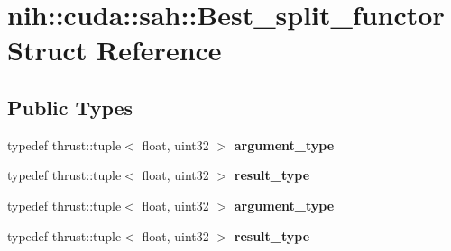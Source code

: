 \hypertarget{structnih_1_1cuda_1_1sah_1_1_best__split__functor}{
\section{nih\-:\-:cuda\-:\-:sah\-:\-:\-Best\-\_\-split\-\_\-functor \-Struct \-Reference}
\label{structnih_1_1cuda_1_1sah_1_1_best__split__functor}
}
\subsection*{\-Public \-Types}
\begin{DoxyCompactItemize}
\item 
\hypertarget{structnih_1_1cuda_1_1sah_1_1_best__split__functor_aa7990901ab2fcd293a7285f19d3d6a17}{
typedef thrust\-::tuple$<$ float, \*
uint32 $>$ {\bfseries argument\-\_\-type}}
\label{structnih_1_1cuda_1_1sah_1_1_best__split__functor_aa7990901ab2fcd293a7285f19d3d6a17}

\item 
\hypertarget{structnih_1_1cuda_1_1sah_1_1_best__split__functor_a71a27969ef787cd4090bc1c295200951}{
typedef thrust\-::tuple$<$ float, \*
uint32 $>$ {\bfseries result\-\_\-type}}
\label{structnih_1_1cuda_1_1sah_1_1_best__split__functor_a71a27969ef787cd4090bc1c295200951}

\item 
\hypertarget{structnih_1_1cuda_1_1sah_1_1_best__split__functor_aa7990901ab2fcd293a7285f19d3d6a17}{
typedef thrust\-::tuple$<$ float, \*
uint32 $>$ {\bfseries argument\-\_\-type}}
\label{structnih_1_1cuda_1_1sah_1_1_best__split__functor_aa7990901ab2fcd293a7285f19d3d6a17}

\item 
\hypertarget{structnih_1_1cuda_1_1sah_1_1_best__split__functor_a71a27969ef787cd4090bc1c295200951}{
typedef thrust\-::tuple$<$ float, \*
uint32 $>$ {\bfseries result\-\_\-type}}
\label{structnih_1_1cuda_1_1sah_1_1_best__split__functor_a71a27969ef787cd4090bc1c295200951}

\end{DoxyCompactItemize}
